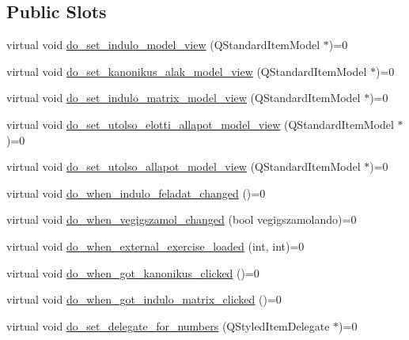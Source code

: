 \subsection*{Public Slots}
\begin{DoxyCompactItemize}
\item 
virtual void \hyperlink{classMainwindow__Gui__Plugin__Interface_a35df40a34eaf1d707d41db3f13862469}{do\+\_\+set\+\_\+indulo\+\_\+model\+\_\+view} (Q\+Standard\+Item\+Model $\ast$)=0
\item 
virtual void \hyperlink{classMainwindow__Gui__Plugin__Interface_a88a3437df47fa2957d31f487c22c5fad}{do\+\_\+set\+\_\+kanonikus\+\_\+alak\+\_\+model\+\_\+view} (Q\+Standard\+Item\+Model $\ast$)=0
\item 
virtual void \hyperlink{classMainwindow__Gui__Plugin__Interface_aeec7915d58c85d9d837c5faa50c9e567}{do\+\_\+set\+\_\+indulo\+\_\+matrix\+\_\+model\+\_\+view} (Q\+Standard\+Item\+Model $\ast$)=0
\item 
virtual void \hyperlink{classMainwindow__Gui__Plugin__Interface_aaea5fac6dda86b300c88ea75462f1d27}{do\+\_\+set\+\_\+utolso\+\_\+elotti\+\_\+allapot\+\_\+model\+\_\+view} (Q\+Standard\+Item\+Model $\ast$)=0
\item 
virtual void \hyperlink{classMainwindow__Gui__Plugin__Interface_a8e804ad75d1078c5331ce8c9a0a6e14d}{do\+\_\+set\+\_\+utolso\+\_\+allapot\+\_\+model\+\_\+view} (Q\+Standard\+Item\+Model $\ast$)=0
\item 
virtual void \hyperlink{classMainwindow__Gui__Plugin__Interface_a844f70d7abef6c8a80a29247d9156bad}{do\+\_\+when\+\_\+indulo\+\_\+feladat\+\_\+changed} ()=0
\item 
virtual void \hyperlink{classMainwindow__Gui__Plugin__Interface_a923f8d92254deadb309f933167c3da70}{do\+\_\+when\+\_\+vegigszamol\+\_\+changed} (bool vegigszamolando)=0
\item 
virtual void \hyperlink{classMainwindow__Gui__Plugin__Interface_a3e925760da906a6cfcc0d9408de19312}{do\+\_\+when\+\_\+external\+\_\+exercise\+\_\+loaded} (int, int)=0
\item 
virtual void \hyperlink{classMainwindow__Gui__Plugin__Interface_a81663cee1a75c8ed846e84c402dbc26c}{do\+\_\+when\+\_\+got\+\_\+kanonikus\+\_\+clicked} ()=0
\item 
virtual void \hyperlink{classMainwindow__Gui__Plugin__Interface_a914d476057d5060ff6cacbcb8a0e235b}{do\+\_\+when\+\_\+got\+\_\+indulo\+\_\+matrix\+\_\+clicked} ()=0
\item 
virtual void \hyperlink{classMainwindow__Gui__Plugin__Interface_a3d3bd884be00beed1591b6856c051d97}{do\+\_\+set\+\_\+delegate\+\_\+for\+\_\+numbers} (Q\+Styled\+Item\+Delegate $\ast$)=0

\end{DoxyCompactItemize}
